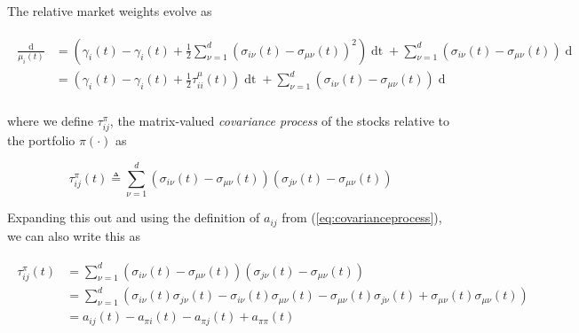 \documentclass[british]{amsart} \usepackage{lmodern}
\numberwithin{equation}{section} \numberwithin{figure}{section}
\theoremstyle{plain} \newtheorem{thm}{\protect\theoremname}[section]
\theoremstyle{definition} \newtheorem{defn}[thm]{\protect\definitionname}
\theoremstyle{plain} \newtheorem{assumption}[thm]{\protect\assumptionname}
\theoremstyle{plain} \newtheorem{lem}[thm]{\protect\lemmaname}
\theoremstyle{plain} \newtheorem{prop}[thm]{\protect\propositionname}
\theoremstyle{remark} \newtheorem{rem}[thm]{\protect\remarkname}
\theoremstyle{plain} \newtheorem{cor}[thm]{\protect\corollaryname}
\renewcommand{\d}[1]{\mathop{\mathrm{d}{#1}}}
\newcommand{\defeq}{\mathop{\triangleq}} \newcommand{\almostsurely}{\text{a.s.}}
\begin{document}
The relative market weights evolve as

  \begin{gather} 
    \label{eq:relativemarketweights}
    \begin{split} 
      \frac{\d{\mu_{i}(t)}}{\mu_{i}(t)} &=
        \left(
         \gamma_{i}(t) - \gamma_{i}(t) + \frac{1}{2} 
            \sum_{\nu=1}^{d}
            \left(
              \sigma_{i\nu}(t) - \sigma_{\mu\nu}(t)
            \right) ^ 2
        \right) \d{t} + 
        \sum_{\nu=1}^{d}
        \left(
          \sigma_{i\nu}(t) - \sigma_{\mu\nu}(t)
        \right) \d{W_{\nu}(t)}  \\
        &=
        \left(
         \gamma_{i}(t) - \gamma_{i}(t) + \frac{1}{2} \tau_{ii}^{\mu}(t)
        \right) \d{t} + 
        \sum_{\nu=1}^{d}
        \left(
          \sigma_{i\nu}(t) - \sigma_{\mu\nu}(t)
        \right) \d{W_{\nu}(t)}  \\
    \end{split}
  \end{gather}

where we define $\tau_{ij}^{\pi}$, the matrix-valued \textit{covariance process}
of the stocks relative to the portfolio $\pi(\cdot)$ as

\begin{equation}
  \label{eq:eqtau}
  \tau_{ij}^{\pi}(t) \defeq
            \sum_{\nu=1}^{d}
            \left(
              \sigma_{i\nu}(t) - \sigma_{\mu\nu}(t)
            \right) 
            \left(
              \sigma_{j\nu}(t) - \sigma_{\mu\nu}(t)
            \right) 
\end{equation}

Expanding this out and using the definition of $a_{ij}$
from (\ref{eq:covarianceprocess}), we can also write this as

  \begin{gather}
    \begin{split}
      \tau_{ij}^{\pi}(t) 
        &=
            \sum_{\nu=1}^{d}
            \left(
              \sigma_{i\nu}(t) - \sigma_{\mu\nu}(t)
            \right) 
            \left(
              \sigma_{j\nu}(t) - \sigma_{\mu\nu}(t)
            \right) \\
        &=
            \sum_{\nu=1}^{d}
            \left(
              \sigma_{i\nu}(t)\sigma_{j\nu}(t) - \sigma_{i\nu}(t)\sigma_{\mu\nu}(t) -
              \sigma_{\mu\nu}(t)\sigma_{j\nu}(t) + \sigma_{\mu\nu}(t)\sigma_{\mu\nu}(t)
            \right) \\
        &= a_{ij}(t) - a_{\pi i}(t) - a_{\pi j}(t) + a_{\pi\pi}(t)
   \end{split}
  \end{gather}
\end{document}
